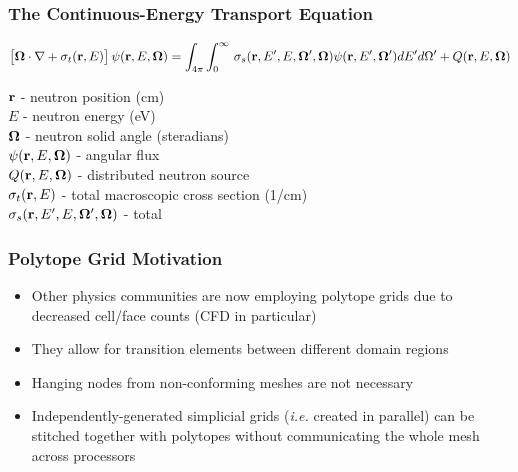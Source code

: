 \documentclass[]{beamer}
\begin{document}
\subsection{}
\begin{frame}[t]\frametitle{The Continuous-Energy Transport Equation}
\begin{block}{}{\footnotesize
\begin{equation*}
\left[ { \bf \Omega} \cdot {\bf \nabla}  + \sigma_t ({\bf r}, E) \right] \psi ({\bf r}, E, {\bf \Omega}) = \int_{4 \pi} \int_{0}^{\infty}  \, \sigma_s ({\bf r}, E' , E, {\bf \Omega}' , {\bf \Omega}) \psi ({\bf r}, E', {\bf \Omega}') d E'  d \Omega'+ Q ({\bf r}, E, {\bf \Omega})
\end{equation*}
}\end{block}
\begin{block}{} {\footnotesize
${\bf r}$ -  neutron position (cm)\\
$E$ -  neutron energy (eV)\\
${\bf \Omega}$ - neutron solid angle (steradians)\\
$\psi  ({\bf r}, E, {\bf \Omega})$ - angular flux  \\
$Q  ({\bf r}, E, {\bf \Omega})$ - distributed neutron source \\
$\sigma_t ({\bf r}, E)$ - total macroscopic cross section (1/cm)\\
$\sigma_s ({\bf r}, E' , E, {\bf \Omega}' , {\bf \Omega})$ - total 
}\end{block}
\end{frame}

\begin{frame}[t]\frametitle{Polytope Grid Motivation}
         \begin{block}{}{\footnotesize
			\begin{itemize}
				\item <1-> Other physics communities are now employing polytope grids due to decreased cell/face counts (CFD in particular)
				\item <2-> They allow for transition elements between different domain regions
				\item <3-> Hanging nodes from non-conforming meshes are not necessary
				\item <4-> Independently-generated simplicial grids ({\em i.e.} created in parallel) can be stitched together with polytopes without communicating the whole mesh across processors
			\end{itemize}}
         \end{block}
	\begin{columns}
	\end{columns}
\end{frame}
\end{document}
